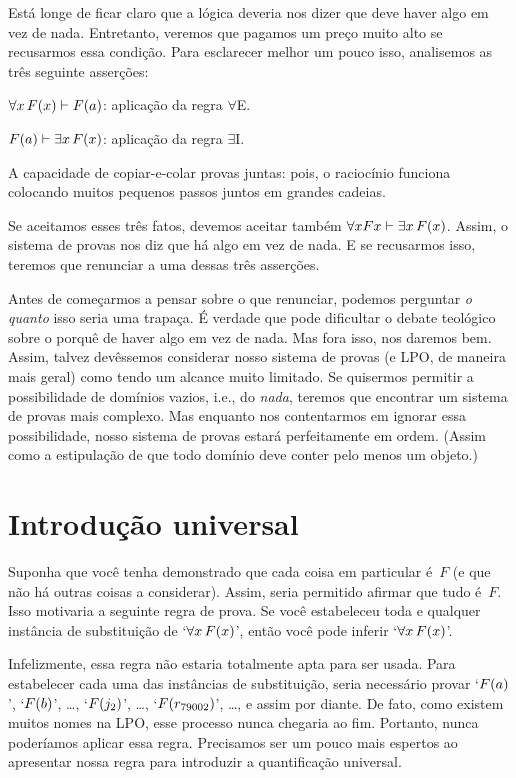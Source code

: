  
Est\'a longe de ficar claro que a l\'ogica deveria nos dizer que deve haver algo em vez de nada. Entretanto, veremos que pagamos um pre\c co muito alto se recusarmos essa condi\c c\~ao. Para esclarecer melhor um pouco isso,  analisemos as tr\^es seguinte asser\c c\~oes:
	\begin{ebullet}
		\item $\forall x\,\mathord{F}(x) \vdash \mathord{F}(a)$:  aplica\c c\~ao da regra  $\forall$E.
		\item $\mathord{F}(a) \vdash \exists x\,\mathord{F}(x)$:  aplica\c c\~ao da regra $\exists$I.
		\item A capacidade de copiar-e-colar provas juntas: pois, o racioc\'inio funciona colocando muitos pequenos passos juntos em grandes cadeias.
	\end{ebullet}
Se aceitamos esses tr\^es fatos, devemos aceitar tamb\'em $\forall xFx \vdash \exists x\,\mathord{F}(x)$.  Assim, o sistema de provas nos diz que h\'a algo em vez de nada. E se recusarmos isso, teremos que renunciar a uma dessas tr\^es asser\c c\~oes. 


Antes de come\c carmos a pensar sobre o que renunciar, podemos perguntar \emph{o quanto} isso seria uma trapa\c ca. \'E verdade que pode dificultar o debate teol\'ogico sobre o porqu\^e de haver algo em vez de nada. Mas fora isso, nos daremos bem. Assim, talvez dev\^essemos considerar nosso sistema de provas (e LPO, de maneira mais geral) como tendo um alcance muito limitado. Se quisermos permitir a possibilidade de dom\'inios vazios, i.e., do \emph{nada}, teremos que encontrar um sistema de provas mais complexo. Mas enquanto nos contentarmos em ignorar essa possibilidade, nosso sistema de provas estar\'a perfeitamente em ordem. (Assim como a estipula\c c\~ao de que todo dom\'inio deve conter pelo menos um objeto.)

\section{Introdu\c c\~ao universal}
Suponha que voc\^e tenha demonstrado que cada coisa em particular \'e~$F$ (e que n\~ao h\'a outras coisas a considerar). Assim, seria permitido afirmar que tudo \'e~$F$. Isso motivaria a seguinte regra de prova. Se voc\^e estabeleceu toda e qualquer inst\^ancia de substitui\c c\~ao de `$\forall x\,\mathord{F}(x)$', ent\~ao voc\^e pode inferir `$\forall x\,\mathord{F}(x)$'. 
 
 Infelizmente, essa regra n\~ao estaria  totalmente apta para ser usada. Para estabelecer cada uma das inst\^ancias de substitui\c c\~ao, seria necess\'ario provar  `$\mathord{F}(a)$', `$\mathord{F}(b)$', \dots, `$\mathord{F}(j_2)$', \dots, `$\mathord{F}(r_{79002})$', \ldots, e assim por diante. De fato, como existem muitos nomes na LPO, esse processo nunca chegaria ao fim. Portanto, nunca poder\'iamos aplicar essa regra. Precisamos ser um pouco mais espertos ao apresentar nossa regra para introduzir a quantifica\c c\~ao universal.
 
